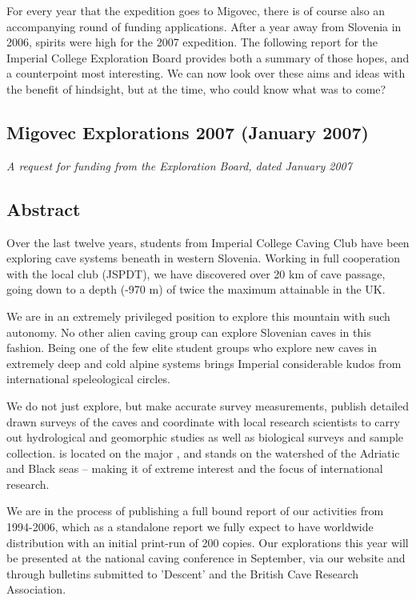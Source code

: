 For every year that the expedition goes to Migovec, there is of course also an accompanying round of funding applications. After a year away from Slovenia in 2006, spirits were high for the 2007 expedition. The following report for the Imperial College Exploration Board provides both a summary of those hopes, and a counterpoint most interesting. We can now look over these aims and ideas with the benefit of hindsight, but at the time, who could know what was to come?


\newpage

\subsection{Migovec Explorations 2007 (January 2007)}
\textit{A request for funding from the Exploration Board, dated January 2007}

\subsection{Abstract}

Over the last twelve years, students from Imperial College Caving Club have been exploring cave systems beneath  in western Slovenia. Working in full cooperation with the local club (JSPDT), we have discovered over 20 km of cave passage, going down to a depth (-970 m) of twice the maximum attainable in the UK.

We are in an extremely privileged position to explore this mountain with such autonomy. No other alien caving group can explore Slovenian caves in this fashion. Being one of the few elite student groups who explore new caves in extremely deep and cold alpine systems brings Imperial considerable kudos from international speleological circles.

We do not just explore, but make accurate survey measurements, publish detailed drawn surveys of the caves and coordinate with local research scientists to carry out hydrological and geomorphic studies as well as biological surveys and sample collection.  is located on the major , and stands on the watershed of the Adriatic and Black seas -- making it of extreme interest and the focus of international research.


We are in the process of publishing a full bound report of our activities from 1994-2006, which as a standalone report we fully expect to have worldwide distribution with an initial print-run of 200 copies. Our explorations this year will be presented at the national caving conference in September, via our website and through bulletins submitted to 'Descent' and the British Cave Research Association.

